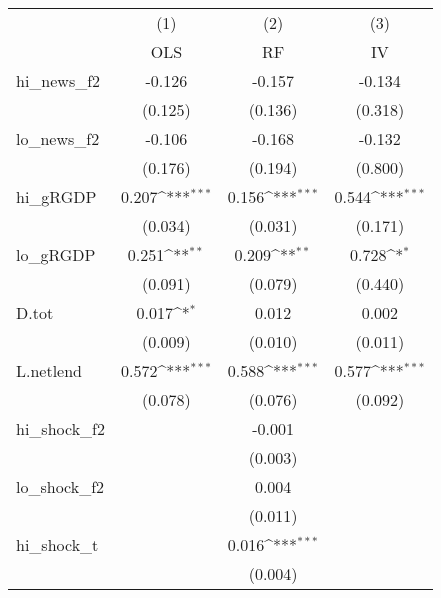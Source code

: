 {
\def\sym#1{\ifmmode^{#1}\else\(^{#1}\)\fi}
\begin{tabular}{l*{3}{c}}
\toprule
            &\multicolumn{1}{c}{(1)}&\multicolumn{1}{c}{(2)}&\multicolumn{1}{c}{(3)}\\
            &\multicolumn{1}{c}{OLS}&\multicolumn{1}{c}{RF}&\multicolumn{1}{c}{IV}\\
\midrule
hi\_news\_f2  &      -0.126         &      -0.157         &      -0.134         \\
            &     (0.125)         &     (0.136)         &     (0.318)         \\
\addlinespace
lo\_news\_f2  &      -0.106         &      -0.168         &      -0.132         \\
            &     (0.176)         &     (0.194)         &     (0.800)         \\
\addlinespace
hi\_gRGDP    &       0.207\sym{***}&       0.156\sym{***}&       0.544\sym{***}\\
            &     (0.034)         &     (0.031)         &     (0.171)         \\
\addlinespace
lo\_gRGDP    &       0.251\sym{**} &       0.209\sym{**} &       0.728\sym{*}  \\
            &     (0.091)         &     (0.079)         &     (0.440)         \\
\addlinespace
D.tot       &       0.017\sym{*}  &       0.012         &       0.002         \\
            &     (0.009)         &     (0.010)         &     (0.011)         \\
\addlinespace
L.netlend   &       0.572\sym{***}&       0.588\sym{***}&       0.577\sym{***}\\
            &     (0.078)         &     (0.076)         &     (0.092)         \\
\addlinespace
hi\_shock\_f2 &                     &      -0.001         &                     \\
            &                     &     (0.003)         &                     \\
\addlinespace
lo\_shock\_f2 &                     &       0.004         &                     \\
            &                     &     (0.011)         &                     \\
\addlinespace
hi\_shock\_t  &                     &       0.016\sym{***}&                     \\
            &                     &     (0.004)         &                     \\

\end{tabular}}

